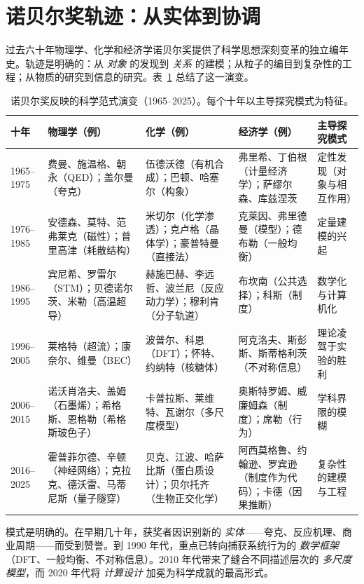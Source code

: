 \documentclass[12pt,a4paper]{article}
\begin{document}
	\section{诺贝尔奖轨迹：从实体到协调}
	
	过去六十年物理学、化学和经济学诺贝尔奖提供了科学思想深刻变革的独立编年史。轨迹是明确的：从 \emph{对象} 的发现到 \emph{关系} 的建模；从粒子的编目到复杂性的工程；从物质的研究到信息的研究。表~\ref{tab:nobel} 总结了这一演变。
	
	\begin{table}[htbp]
		\centering
		\caption{诺贝尔奖反映的科学范式演变（1965–2025）。每个十年以主导探究模式为特征。}
		\label{tab:nobel}
		\small
		\begin{tabular}{p{2.5cm}p{3.5cm}p{3.5cm}p{2.5cm}p{2.8cm}}
			\toprule
			\textbf{十年} & \textbf{物理学（例）} & \textbf{化学（例）} & \textbf{经济学（例）} & \textbf{主导探究模式} \\
			\midrule
			1965–1975 & 费曼、施温格、朝永（QED）；盖尔曼（夸克） & 伍德沃德（有机合成）；巴顿、哈塞尔（构象） & 弗里希、丁伯根（计量经济学）；萨缪尔森、库兹涅茨 & 定性发现（对象与相互作用） \\
			1976–1985 & 安德森、莫特、范弗莱克（磁性）；普里高津（耗散结构） & 米切尔（化学渗透）；克卢格（晶体学）；豪普特曼（直接法） & 克莱因、弗里德曼（模型）；德布勒（一般均衡） & 定量建模的兴起 \\
			1986–1995 & 宾尼希、罗雷尔（STM）；贝德诺尔茨、米勒（高温超导） & 赫施巴赫、李远哲、波兰尼（反应动力学）；穆利肯（分子轨道） & 布坎南（公共选择）；科斯（制度） & 数学化与计算机化 \\
			1996–2005 & 莱格特（超流）；康奈尔、维曼（BEC） & 波普尔、科恩（DFT）；怀特、约纳特（核糖体） & 阿克洛夫、斯彭斯、斯蒂格利茨（不对称信息） & 理论凌驾于实验的胜利 \\
			2006–2015 & 诺沃肖洛夫、盖姆（石墨烯）；希格斯、恩格勒（希格斯玻色子） & 卡普拉斯、莱维特、瓦谢尔（多尺度模型） & 奥斯特罗姆、威廉姆森（制度）；席勒（行为） & 学科界限的模糊 \\
			2016–2025 & 霍普菲尔德、辛顿（神经网络）；克拉克、德沃雷、马蒂尼斯（量子隧穿） & 贝克、江波、哈萨比斯（蛋白质设计）；贝尔托齐（生物正交化学） & 阿西莫格鲁、约翰逊、罗宾逊（制度作为代码）；卡德（因果推断） & 复杂性的建模与工程 \\
			\bottomrule
		\end{tabular}
	\end{table}
	
	模式是明确的。在早期几十年，获奖者因识别新的 \emph{实体}——夸克、反应机理、商业周期——而受到赞誉。到 1990 年代，重点已转向捕获系统行为的 \emph{数学框架}（DFT、一般均衡、不对称信息）。2010 年代带来了缝合不同描述层次的 \emph{多尺度模型}，而 2020 年代将 \emph{计算设计} 加冕为科学成就的最高形式。
	
\end{document}
